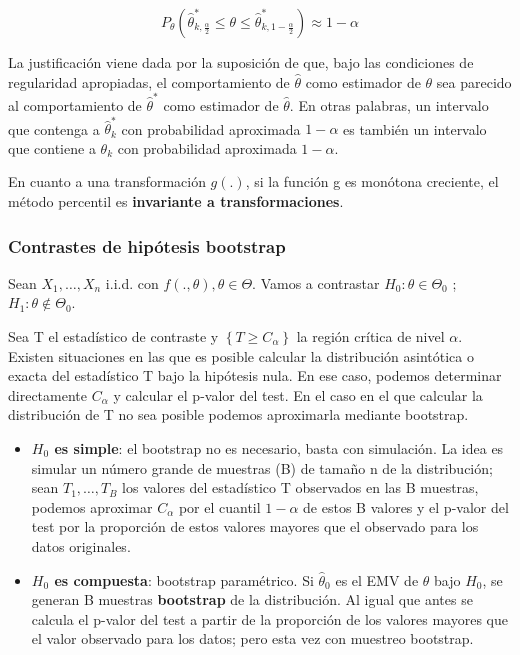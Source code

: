 $$P_\theta\left(\hat\theta^*_{k,\frac{\alpha}{2}}\leq\theta\leq\hat\theta^*_{k,1-\frac{\alpha}{2}}\right)\approx 1-\alpha$$

La justificación viene dada por la suposición de que, bajo las condiciones de regularidad apropiadas, el comportamiento de $\hat\theta$ como estimador de $\theta$ sea parecido al comportamiento de $\hat\theta^*$ como estimador de $\hat\theta$.
En otras palabras, un intervalo que contenga a $\hat\theta^*_{k}$ con probabilidad aproximada $1-\alpha$ es también un intervalo que contiene a $\theta_k$ con probabilidad aproximada $1-\alpha$.

En cuanto a una transformación $g(.)$, si la función g es monótona creciente, el método percentil es \textbf{invariante a transformaciones}.

\newpage

\subsubsection{Contrastes de hipótesis bootstrap}

Sean $X_1,\dots,X_n$ i.i.d. con $f(.,\theta), \theta\in\Theta$. Vamos a contrastar $H_0: \theta\in\Theta_0$ ; $H_1:\theta\notin\Theta_0$.

Sea T el estadístico de contraste y $\left\{T \geq C_\alpha\right\}$ la región crítica de nivel $\alpha$. Existen situaciones en las que es posible calcular la distribución asintótica o exacta del estadístico T bajo la hipótesis nula.
En ese caso, podemos determinar directamente $C_\alpha$ y calcular el p-valor del test. En el caso en el que calcular la distribución de T no sea posible podemos aproximarla mediante bootstrap.

\begin{itemize}
    \item \textbf{$H_0$ es simple}: el bootstrap no es necesario, basta con simulación. La idea es simular un número grande de muestras (B) de tamaño n de la distribución; sean $T_1,\dots,T_B$ los valores del estadístico T observados en las B muestras, podemos aproximar $C_\alpha$ por el cuantil $1-\alpha$ de estos B valores y el p-valor del test por la proporción de estos valores mayores que el observado para los datos originales.
    \item \textbf{$H_0$ es compuesta}: bootstrap paramétrico. Si $\hat\theta_0$ es el EMV de $\theta$ bajo $H_0$, se generan B muestras \textbf{bootstrap} de la distribución. Al igual que antes se calcula el p-valor del test a partir de la proporción de los valores mayores que el valor observado para los datos; pero esta vez con muestreo bootstrap.
\end{itemize}

